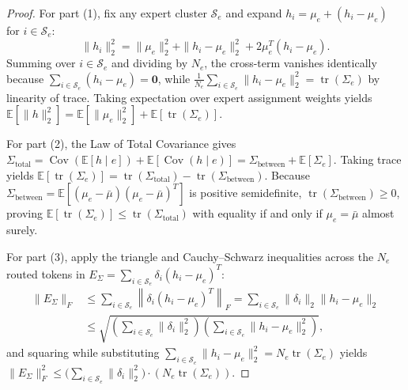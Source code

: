 \documentclass[10pt,twocolumn,letterpaper]{article}
\begin{document}
\begin{proof}
For part (1), fix any expert cluster $\mathcal{S}_e$ and expand $h_i = \mu_e + (h_i - \mu_e)$ for $i \in \mathcal{S}_e$:
\begin{equation}
    \|h_i\|_2^2 = \|\mu_e\|_2^2 + \|h_i - \mu_e\|_2^2 + 2 \mu_e^T (h_i - \mu_e).
\end{equation}
Summing over $i \in \mathcal{S}_e$ and dividing by $N_e$, the cross-term vanishes identically because $\sum_{i \in \mathcal{S}_e} (h_i - \mu_e) = \mathbf{0}$, while $\frac{1}{N_e}\sum_{i \in \mathcal{S}_e}\|h_i - \mu_e\|_2^2 = \operatorname{tr}(\Sigma_e)$ by linearity of trace. Taking expectation over expert assignment weights yields $\mathbb{E}[\|h\|_2^2] = \mathbb{E}[\|\mu_e\|_2^2] + \mathbb{E}[\operatorname{tr}(\Sigma_e)]$.

For part (2), the Law of Total Covariance gives $\Sigma_{\text{total}} = \operatorname{Cov}(\mathbb{E}[h \mid e]) + \mathbb{E}[\operatorname{Cov}(h \mid e)] = \Sigma_{\text{between}} + \mathbb{E}[\Sigma_e]$. Taking trace yields $\mathbb{E}[\operatorname{tr}(\Sigma_e)] = \operatorname{tr}(\Sigma_{\text{total}}) - \operatorname{tr}(\Sigma_{\text{between}})$. Because $\Sigma_{\text{between}} = \mathbb{E}[(\mu_e - \bar{\mu})(\mu_e - \bar{\mu})^T]$ is positive semidefinite, $\operatorname{tr}(\Sigma_{\text{between}}) \ge 0$, proving $\mathbb{E}[\operatorname{tr}(\Sigma_e)] \le \operatorname{tr}(\Sigma_{\text{total}})$ with equality if and only if $\mu_e = \bar{\mu}$ almost surely.

For part (3), apply the triangle and Cauchy--Schwarz inequalities across the $N_e$ routed tokens in $E_\Sigma = \sum_{i \in \mathcal{S}_e} \delta_i (h_i - \mu_e)^T$:
\begin{equation}
\begin{aligned}
    \|E_\Sigma\|_F &\le \sum_{i \in \mathcal{S}_e} \left\| \delta_i (h_i - \mu_e)^T \right\|_F = \sum_{i \in \mathcal{S}_e} \|\delta_i\|_2 \|h_i - \mu_e\|_2 \\
    &\le \sqrt{\left(\sum_{i \in \mathcal{S}_e} \|\delta_i\|_2^2\right) \left(\sum_{i \in \mathcal{S}_e} \|h_i - \mu_e\|_2^2\right)},
\end{aligned}
\end{equation}
and squaring while substituting $\sum_{i \in \mathcal{S}_e} \|h_i - \mu_e\|_2^2 = N_e \operatorname{tr}(\Sigma_e)$ yields $\|E_\Sigma\|_F^2 \le \big(\sum_{i \in \mathcal{S}_e}\|\delta_i\|_2^2\big) \cdot (N_e \operatorname{tr}(\Sigma_e))$.


\end{proof}
\end{document}
